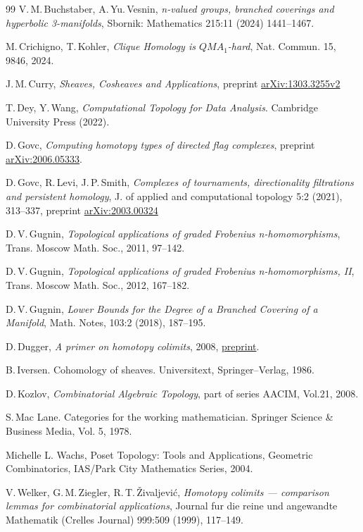 \documentclass[english,12pt,oneside]{amsproc}
\numberwithin{equation}{section}
\theoremstyle{plain}
\theoremstyle{definition}
\theoremstyle{remark}
\begin{document}
\begin{thebibliography}{99}
V.\,M.\,Buchstaber, A.\,Yu.\,Vesnin, \textit{n-valued groups, branched coverings and hyperbolic 3-manifolds},
Sbornik: Mathematics 215:11 (2024) 1441--1467.

M.\,Crichigno, T.\,Kohler, \textit{Clique Homology is $QMA_1$-hard}, Nat. Commun. 15, 9846, 2024.

 J.\,M.\,Curry, \textit{Sheaves, Cosheaves  and  Applications}, preprint \href{https://arxiv.org/abs/1303.3255}{arXiv:1303.3255v2}

T.\,Dey, Y.\,Wang, \textit{Computational Topology for Data Analysis}. Cambridge University Press (2022).

D.\,Govc, \textit{Computing homotopy types of directed flag complexes}, preprint \href{https://arxiv.org/abs/2006.05333}{	arXiv:2006.05333}.

D.\,Govc, R.\,Levi, J.\,P.\,Smith, \textit{Complexes of tournaments, directionality filtrations  and  persistent homology}, J. of applied  and  computational topology 5:2 (2021), 313--337, preprint \href{https://arxiv.org/abs/2003.00324}{arXiv:2003.00324}
%

D.\,V.\,Gugnin, \textit{Topological applications of graded Frobenius n-homomorphisms}, Trans. Moscow Math. Soc., 2011, 97--142.

D.\,V.\,Gugnin, \textit{Topological applications of graded Frobenius n-homomorphisms, II}, Trans. Moscow Math. Soc., 2012, 167--182.

D.\,V.\,Gugnin, \textit{Lower Bounds for the Degree of a Branched Covering of a Manifold}, Math. Notes, 103:2 (2018), 187--195.

D.\,Dugger, \textit{A primer on homotopy colimits}, 2008, \href{https://pages.uoregon.edu/ddugger/hocolim.pdf}{preprint}.

B.\,Iversen. Cohomology of sheaves. Universitext, Springer--Verlag, 1986.

D.\,Kozlov, \textit{Combinatorial Algebraic Topology}, part of series AACIM, Vol.21, 2008.

S.\,Mac Lane. Categories for the working mathematician. Springer Science \& Business Media, Vol. 5, 1978.


Michelle L. Wachs, Poset Topology: Tools and Applications, Geometric Combinatorics, IAS/Park City Mathematics Series, 2004.

V.\,Welker, G.\,M.\,Ziegler, R.\,T.\,\v{Z}ivaljevi\'{c}, \textit{Homotopy colimits --- comparison lemmas for combinatorial applications}, Journal fur die reine und angewandte Mathematik (Crelles Journal) 999:509 (1999), 117--149.

\end{thebibliography}
\end{document}
